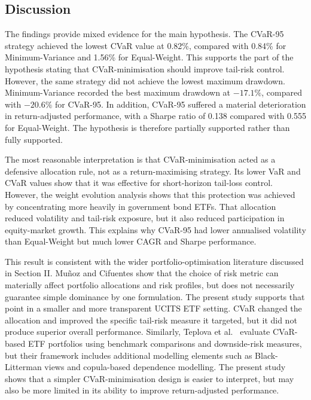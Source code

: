 \subsection{Discussion}
\par The findings provide mixed evidence for the main hypothesis. The CVaR-95 strategy achieved the lowest CVaR value at 0.82\%, compared with 0.84\% for Minimum-Variance and 1.56\% for Equal-Weight. This supports the part of the hypothesis stating that CVaR-minimisation should improve tail-risk control. However, the same strategy did not achieve the lowest maximum drawdown. Minimum-Variance recorded the best maximum drawdown at $-17.1\%$, compared with $-20.6\%$ for CVaR-95. In addition, CVaR-95 suffered a material deterioration in return-adjusted performance, with a Sharpe ratio of 0.138 compared with 0.555 for Equal-Weight. The hypothesis is therefore partially supported rather than fully supported.
\par The most reasonable interpretation is that CVaR-minimisation acted as a defensive allocation rule, not as a return-maximising strategy. Its lower VaR and CVaR values show that it was effective for short-horizon tail-loss control. However, the weight evolution analysis shows that this protection was achieved by concentrating more heavily in government bond ETFs. That allocation reduced volatility and tail-risk exposure, but it also reduced participation in equity-market growth. This explains why CVaR-95 had lower annualised volatility than Equal-Weight but much lower CAGR and Sharpe performance.
\par This result is consistent with the wider portfolio-optimisation literature discussed in Section II. Mu\~{n}oz and Cifuentes \cite{munoz2026riskmetrics} show that the choice of risk metric can materially affect portfolio allocations and risk profiles, but does not necessarily guarantee simple dominance by one formulation. The present study supports that point in a smaller and more transparent UCITS ETF setting. CVaR changed the allocation and improved the specific tail-risk measure it targeted, but it did not produce superior overall performance. Similarly, Teplova et al.\ \cite{teplova2023blcopula} evaluate CVaR-based ETF portfolios using benchmark comparisons and downside-risk measures, but their framework includes additional modelling elements such as Black-Litterman views and copula-based dependence modelling. The present study shows that a simpler CVaR-minimisation design is easier to interpret, but may also be more limited in its ability to improve return-adjusted performance.
